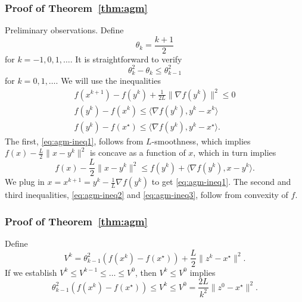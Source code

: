 \documentclass[10pt,mathserif]{beamer}
\begin{document}
\begin{frame}[plain]
\frametitle{Proof of Theorem~\ref{thm:agm}}
Preliminary observations.
Define
\[
\theta_{k}=\frac{k+1}{2}
\]
for $k=-1,0,1,\dots$. 
It is straightforward to verify
\begin{equation}
\theta_k^2-\theta_k\le \theta_{k-1}^2
\label{eq:agm-phi-rel}
\end{equation}
for $k=0,1,\dots$.
We will use the inequalities
\begin{gather}
f(x^{k+1})
-f(y^{k})+\frac{1}{2L}\|\nabla f(y^k)\|^2
\le 0
\label{eq:agm-ineq1}\\
f(y^{k})-f(x^{k})\le\langle \nabla f(y^k),y^k-x^k\rangle
\label{eq:agm-ineq2}\\
f(y^{k})-f(x^{\star})\le\langle \nabla f(y^k),y^k-x^\star\rangle.
\label{eq:agm-ineq3}
\end{gather}
The first, \eqref{eq:agm-ineq1}, follows from $L$-smoothness, which implies $f(x)-\frac{L}{2}\|x-y^k\|^2$ is concave as a function of $x$, which in turn implies
\[
f(x)-\frac{L}{2}\|x-y^k\|^2\le 
f(y^{k})+\langle \nabla f(y^k),x-y^k\rangle.
\]
We plug in $x=x^{k+1}=y^k-\frac{1}{L}\nabla f(y^k)$ to get \eqref{eq:agm-ineq1}.
The second and third inequalities, \eqref{eq:agm-ineq2} and \eqref{eq:agm-ineq3}, follow from convexity of $f$.
\end{frame}


\begin{frame}
\frametitle{Proof of Theorem~\ref{thm:agm}}
Define
\[
V^k=
\theta_{k-1}^2
\left(f(x^k)-f(x^\star)\right)+\frac{L}{2}\|z^k-x^\star\|^2.
\]
If we establish $V^{k}\le V^{k-1}\le \dots \le V^0$, then $V^k\le V^0$ implies
\[
\theta_{k-1}^2(f(x^k)-f(x^\star))\le V^k\le V^0= \frac{2L}{k^2}\|z^0-x^\star\|^2.
\]
\end{frame}
\end{document}
